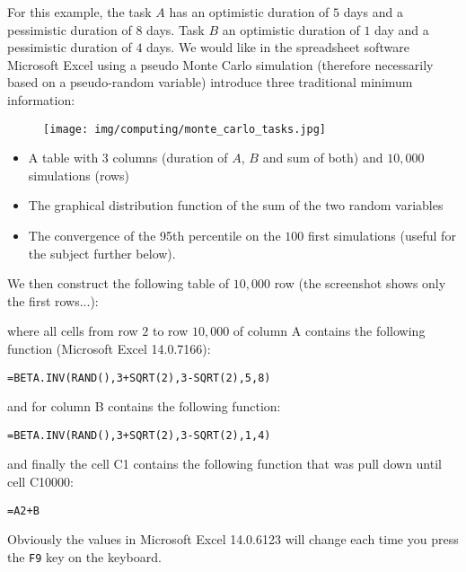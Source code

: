 	For this example, the task $A$ has an optimistic duration of $5$ days and a pessimistic duration of $8$ days. Task $B$ an optimistic duration of $1$ day and a pessimistic duration of $4$ days. We would like in the spreadsheet software Microsoft Excel using a pseudo Monte Carlo simulation (therefore necessarily based on a pseudo-random variable) introduce three traditional minimum information:
	\begin{figure}[H]
		\centering
		\texttt{[image: img/computing/monte\_carlo\_tasks.jpg]}
	\end{figure}
	\begin{itemize}
		\item A table with $3$ columns (duration of $A$, $B$ and sum of both) and $10,000$ simulations (rows)
	
		\item The graphical distribution function of the sum of the two random variables 

		\item The convergence of the 95th percentile on the $100$ first simulations (useful for the subject further below).
	\end{itemize}
	We then construct the following table of $10,000$ row (the screenshot shows only the first rows...):

	where all cells from row $2$ to row $10,000$ of column A contains the following function (Microsoft Excel 14.0.7166):

	\begin{center}
	\texttt{=BETA.INV(RAND(),3+SQRT(2),3-SQRT(2),5,8)}
	\end{center}

	and for column B contains the following function:

	\begin{center}
	\texttt{=BETA.INV(RAND(),3+SQRT(2),3-SQRT(2),1,4)}
	\end{center}

	and finally the cell C1 contains the following function that was pull down until cell C10000:
	
	\begin{center}
	\texttt{=A2+B}
	\end{center}
	
	Obviously the values in Microsoft Excel 14.0.6123 will change each time you press the \texttt{F9} key on the keyboard.

